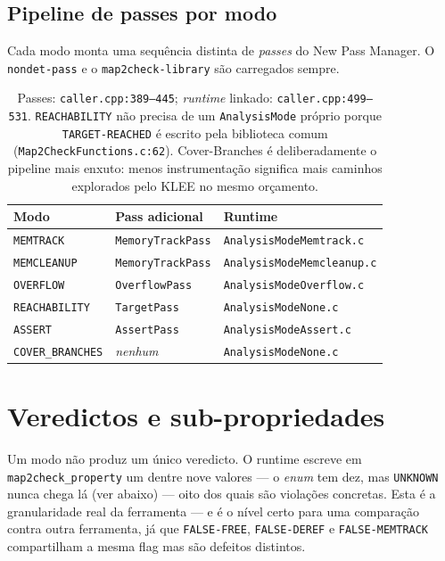 \documentclass[11pt,a4paper]{article}
\newcommand{\code}[1]{\texttt{#1}}
\newcommand{\src}[1]{{\small\texttt{#1}}}
\begin{document}
\subsection{Pipeline de passes por modo}

Cada modo monta uma sequência distinta de \emph{passes} do New Pass Manager. O
\code{nondet-pass} e o \code{map2check-library} são carregados sempre.

\begin{table}[H]
\centering
\small
\begin{tabularx}{\textwidth}{@{}L{3.4cm} L{4.3cm} Y@{}}
\toprule
\textbf{Modo} & \textbf{Pass adicional} & \textbf{Runtime} \\
\midrule
\code{MEMTRACK}       & \code{MemoryTrackPass}  & \code{AnalysisModeMemtrack.c} \\
\code{MEMCLEANUP}     & \code{MemoryTrackPass}  & \code{AnalysisModeMemcleanup.c} \\
\code{OVERFLOW}       & \code{OverflowPass}     & \code{AnalysisModeOverflow.c} \\
\code{REACHABILITY}   & \code{TargetPass}       & \code{AnalysisModeNone.c} \\
\code{ASSERT}         & \code{AssertPass}       & \code{AnalysisModeAssert.c} \\
\code{COVER\_BRANCHES}& \emph{nenhum}           & \code{AnalysisModeNone.c} \\
\bottomrule
\end{tabularx}
\caption{Passes: \src{caller.cpp:389--445}; \emph{runtime} linkado:
\src{caller.cpp:499--531}. \code{REACHABILITY} não precisa de um
\code{AnalysisMode} próprio porque \code{TARGET-REACHED} é escrito pela
biblioteca comum (\src{Map2CheckFunctions.c:62}). Cover-Branches é
deliberadamente o pipeline mais enxuto: menos instrumentação significa mais
caminhos explorados pelo KLEE no mesmo orçamento.}
\end{table}

\section{Veredictos e sub-propriedades}

Um modo não produz um único veredicto. O runtime escreve em
\code{map2check\_property} um dentre nove valores --- o \emph{enum} tem dez,
mas \code{UNKNOWN} nunca chega lá (ver abaixo) --- oito dos quais são violações
concretas. Esta é a granularidade real da ferramenta --- e é o nível certo para
uma comparação contra outra ferramenta, já que \code{FALSE-FREE},
\code{FALSE-DEREF} e \code{FALSE-MEMTRACK} compartilham a mesma flag mas são
defeitos distintos.
\end{document}
